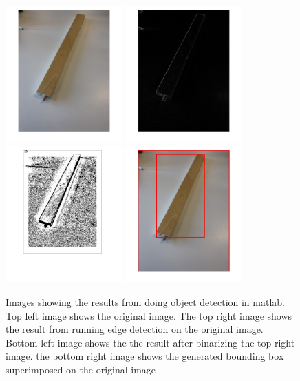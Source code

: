 \begin{figure}[hbtp]
\begin{center}
\includegraphics[width = 0.4\textwidth]{./Images/matlabImage1.png}
\includegraphics[width = 0.4\textwidth]{./Images/matlabImage2.png}
\includegraphics[width = 0.4\textwidth]{./Images/matlabImage3.png} 
\includegraphics[width = 0.4\textwidth]{./Images/matlabImage4.png} 
\caption{Images showing the results from doing object detection in matlab. Top left image shows the original image. The top right image shows the result from running edge detection on the original image. Bottom left image shows the the result after  binarizing the top right image. the bottom right image shows the generated bounding box superimposed on the original image}
\label{fig:matlabImages}
\end{center}
\end{figure}
